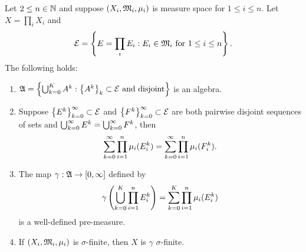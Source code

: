 \documentclass[a4paper]{article}
\begin{document}
\begin{thm}
Let $2 \leq n \in \mathbb{N}$ and suppose $(X_i, \mathfrak{M}_i, \mu_i)$
is measure space for $1 \leq i \leq n$. Let 
$X = \prod_i X_i$ and 
\[
\mathcal{E} = \left\{ E = \prod_i E_i : 
\text{$E_i \in \mathfrak{M}_i$ for $1 \leq i \leq n$} \right\}.
\]
The following holds: 
\begin{enumerate}
\item $\mathfrak{A} = \left\{ \bigcup_{k=0}^K A^k : 
\text{$\left\{ A^k \right\}_k \subset \mathcal{E}$ and disjoint} 
\right\}$ is an algebra.

\item Suppose $\left\{ E^k \right\}_{k=0}^\infty \subset \mathcal{E}$ and 
$\left\{ F^k \right\}_{k=0}^\infty \subset \mathcal{E}$ are both pairwise disjoint sequences 
of sets and $\bigcup_{k=0}^\infty{E^k} = \bigcup_{k=0}^\infty{F^k}$, then 
\[
\sum_{k=0}^\infty \prod_{i=1}^n \mu_i(E_i^k) = 
\sum_{k=0}^\infty \prod_{i=1}^n \mu_i(F_i^k).
\]

\item The map $\gamma: \mathfrak{A} \to [0, \infty]$ defined by 
\[
\gamma \left( \bigcup_{k=0}^K \prod_{i=1}^n E_i^k \right)
= \sum_{k=0}^K \prod_{i=1}^n \mu_i(E_i^k)
\]
is a well-defined pre-measure.

\item If $(X_i, \mathfrak{M}_i, \mu_i)$ is $\sigma$-finite, then 
$X$ is $\gamma$ $\sigma$-finite.
\end{enumerate}
\end{thm}
\end{document}

